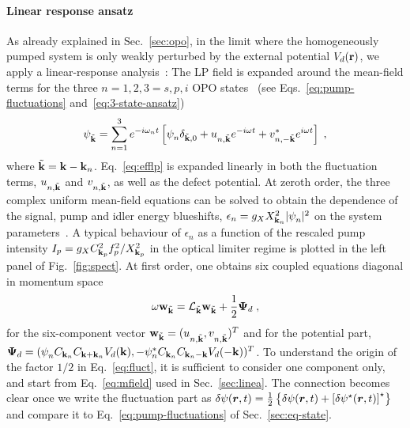 \paragraph{Linear response ansatz}
As already explained in Sec.~\ref{sec:opo}, in the limit where the
homogeneously pumped system is only weakly perturbed by the external
potential $V_d(\mathbf{r})$, we apply a linear-response
analysis~\cite{Astrakharchik_2004}: The LP field is expanded around
the mean-field terms for the three $n=1,2,3=s,p,i$ OPO
states~\cite{Whittaker_2005} (see Eqs.~\eqref{eq:pump-fluctuations}
and~\eqref{eq:3-state-ansatz})
%
\begin{equation}
  \psi_{\tilde{\mathbf{k}}}^{} = \sum_{n=1}^3 e^{-i \omega_n t}
  \left[\psi_{n}^{} \delta_{\tilde{\mathbf{k}},0} +
    u_{n,\tilde{\mathbf{k}}}^{} e^{-i\omega t} +
    v^*_{n,-\tilde{\mathbf{k}}} e^{i\omega t} \right]\; ,
\label{eq:expan}
\end{equation}
%
where $\tilde{\mathbf{k}} = \mathbf{k} - \mathbf{k}_n$. Eq.~\eqref{eq:efflp} is
expanded linearly in both the fluctuation terms,
$u_{n,\tilde{\mathbf{k}}}^{}$ and $v_{n,\tilde{\mathbf{k}}}^{}$, as well as
the defect potential.  At zeroth order, the three complex uniform
mean-field equations can be solved to obtain the dependence of the
signal, pump and idler energy blueshifts,
$\epsilon_n = g_X X^2_{\mathbf{k}_n} |\psi_{n}^{}|^2$ on the system
parameters~\cite{Wouters_2007_b}. A typical behaviour of $\epsilon_n$
as a function of the rescaled pump intensity
$I_p = g_X C_{\mathbf{k}_p}^2 f_p^2/X_{\mathbf{k}_p}^2$ in the optical limiter
regime is plotted in the left panel of Fig.~\ref{fig:spect}.
%
At first order, one obtains six coupled equations diagonal in momentum
space~\cite{Wouters_2007}
%
\begin{equation}
  \omega \mathbf{w}_{\tilde{\mathbf{k}}} = \mathcal{L}_{\tilde{\mathbf{k}}}
  \mathbf{w}_{\tilde{\mathbf{k}}} + \frac{1}{2} \bm{\Psi}_d\; ,
\label{eq:fluct}
\end{equation}
%
for the six-component vector
$\mathbf{w}_{\tilde{\mathbf{k}}} = (u_{n,\tilde{\mathbf{k}}}^{} ,
v_{n,\tilde{\mathbf{k}}}^{})^{T}$ and for the potential part,
$\bm{\Psi}_d = (\psi_n^{} C_{\mathbf{k}_n} C_{\mathbf{k} + \mathbf{k}_n}
V_d(\mathbf{k}),-\psi_n^* C_{\mathbf{k}_n} C_{\mathbf{k}_n - \mathbf{k}}
V_d(-\mathbf{k}))^{T}$. To understand the origin of the factor $1/2$ in
Eq.~\eqref{eq:fluct}, it is sufficient to consider one component only,
and start from Eq.~\eqref{eq:mfield} used in Sec.~\ref{sec:linea}. The
connection becomes clear once we write the fluctuation part as
$\delta\psi(\bm{r},t) = \frac{1}{2}\left\{\delta\psi(\bm{r},t)
  +\left[\delta\psi^{\star}(\bm{r},t)\right]^{\star}\right\}$ and compare
it to Eq.~\eqref{eq:pump-fluctuations} of Sec.~\ref{sec:eq-state}.


